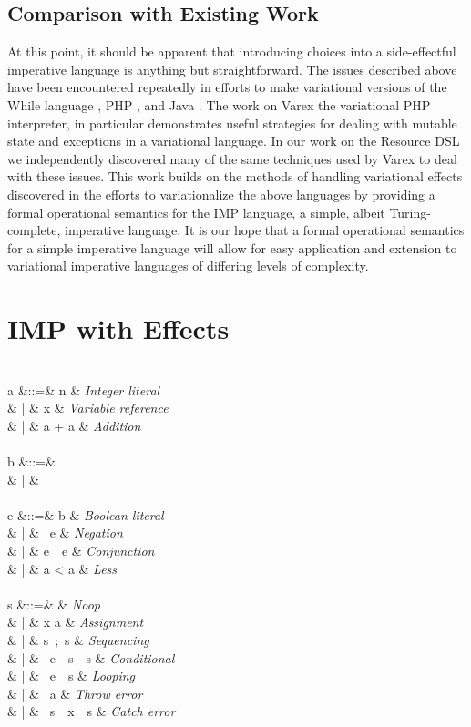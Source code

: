 \documentclass[letterpaper,10pt,onecolumn]{article}
\begin{document}
\subsection{Comparison with Existing Work}

At this point, it should be apparent that introducing choices into a side-effectful imperative language
is anything but straightforward. The issues described above have been encountered repeatedly in efforts to
make variational versions of the While language \cite{varwhile}, PHP \cite{varex}, and Java \cite{varexj}.
The work on Varex the variational PHP interpreter, in particular demonstrates useful strategies for dealing
with mutable state and exceptions in a variational language.
In our work on the Resource DSL we independently discovered many of the same techniques used by Varex
to deal with these issues.
This work builds on the methods of handling variational effects discovered in the efforts to variationalize the
above languages by providing a formal operational semantics for the IMP language, a simple, albeit Turing-complete, imperative
language. It is our hope that a formal operational semantics for a simple imperative language will allow for easy application
and extension to variational imperative languages of differing levels of complexity.

\section{IMP with Effects}

\begin{syntax}
\\
a &::=& n & \textit{Integer literal} \\
& | & x & \textit{Variable reference} \\
& | & a + a & \textit{Addition} \\
 \\
b &::=&  \\
& | &  \\
 \\
e &::=& b & \textit{Boolean literal} \\
& | & \ e & \textit{Negation} \\
& | & e\ \ e & \textit{Conjunction} \\
& | & a < a & \textit{Less} \\
 \\
s &::=&  & \textit{Noop} \\
& | & x \coloneqq a & \textit{Assignment} \\
& | & s\ ;\ s & \textit{Sequencing} \\
& | & \ e\ \ s\ \ s & \textit{Conditional} \\
& | & \ e\ \ s & \textit{Looping} \\
& | & \ a & \textit{Throw error} \\
& | & \ s\ \ x\ \ s & \textit{Catch error}
\end{syntax}
\end{document}

